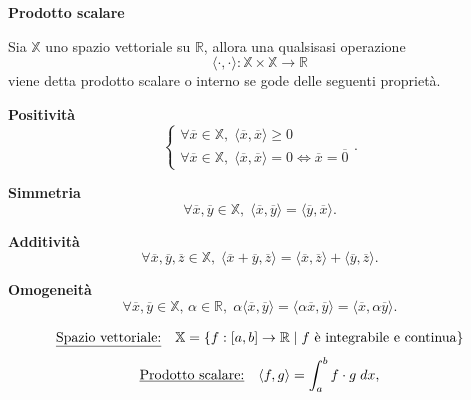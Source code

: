 \begin{definition}
    \textbf{Prodotto scalare}

    Sia $\mathbb{X}$ uno spazio vettoriale su $\mathbb{R}$, allora una qualsisasi operazione
    \[\langle \cdot, \cdot \rangle: \mathbb{X}\times\mathbb{X}\rightarrow\mathbb{R}\]
    viene detta prodotto scalare o interno se gode delle seguenti proprietà.
    \begin{property}
        \textbf{Positività}
        \[
            \begin{cases}
                \forall\overline{x}\in\mathbb{X},\;
                \langle\overline{x},\overline{x}\rangle \geq 0\\
                \forall\overline{x}\in\mathbb{X},\;
                \langle\overline{x},\overline{x}\rangle = 0 \Leftrightarrow
                \overline{x}=\overline{0}
            \end{cases}.
        \]
    \end{property}
    \begin{property}
        \textbf{Simmetria}
        \[
            \forall\overline{x},\overline{y}\in\mathbb{X},\;
            \langle\overline{x},\overline{y}\rangle=\langle\overline{y},\overline{x}\rangle.
        \]
    \end{property}
    \begin{property}
        \textbf{Additività}
        \[
            \forall\overline{x},\overline{y},\overline{z}\in\mathbb{X},\;
            \langle\overline{x}+\overline{y},\overline{z}\rangle=
            \langle\overline{x},\overline{z}\rangle +
            \langle\overline{y},\overline{z}\rangle.
        \]
    \end{property}
    \begin{property}
        \textbf{Omogeneità}
        \[
            \forall\overline{x},\overline{y}\in\mathbb{X},\, \alpha\in\mathbb{R},\;
            \alpha\langle\overline{x},\overline{y}\rangle = \langle\alpha\overline{x},\overline{y}
            \rangle = \langle\overline{x},\alpha\overline{y}\rangle.
        \]
    \end{property}
    \begin{example}
        \[
            \text{\underline{Spazio vettoriale:}} \quad \mathbb{X }= \left\{f:\left[a, b\right]\rightarrow\mathbb{R} \mid f \text{ è integrabile e continua}\right\}
        \]\[
            \text{\underline{Prodotto scalare:}} \quad \langle f,g\rangle = \int_{a}^{b}f\cdot g \;dx,
        \]
    \end{example}
\end{definition}

